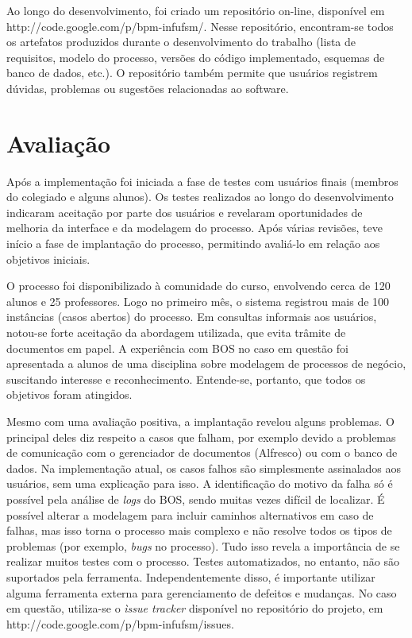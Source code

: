 \documentclass[12pt]{article}
\begin{document}
Ao longo do desenvolvimento, foi criado um repositório on-line, disponível em http://code.google.com/p/bpm-infufsm/. Nesse repositório, encontram-se todos os artefatos produzidos durante o desenvolvimento do trabalho (lista de requisitos, modelo do processo, versões do código implementado, esquemas de banco de dados, etc.). O repositório também permite que usuários registrem dúvidas, problemas ou sugestões relacionadas ao software.


\section{Avaliação}

Após a implementação foi iniciada a fase de testes com usuários finais (membros do colegiado e alguns alunos). Os testes realizados ao longo do desenvolvimento indicaram aceitação por parte dos usuários e revelaram oportunidades de melhoria da interface e da modelagem do processo. Após várias revisões, teve início a fase de implantação do processo, permitindo avaliá-lo em relação aos objetivos iniciais.

O processo foi disponibilizado à comunidade do curso, envolvendo cerca de 120 alunos e 25 professores. Logo no primeiro mês, o sistema registrou mais de 100 instâncias (casos abertos) do processo. Em consultas informais aos usuários, notou-se forte aceitação da abordagem utilizada, que evita trâmite de documentos em papel. A experiência com BOS no caso em questão foi apresentada a alunos de uma disciplina sobre modelagem de processos de negócio, suscitando interesse e reconhecimento. Entende-se, portanto, que todos os objetivos foram atingidos.

Mesmo com uma avaliação positiva, a implantação revelou alguns problemas. O principal deles diz respeito a casos que falham, por exemplo devido a problemas de comunicação com o gerenciador de documentos (Alfresco) ou com o banco de dados. Na implementação atual, os casos falhos são simplesmente assinalados aos usuários, sem uma explicação para isso. A identificação do motivo da falha só é possível pela análise de \emph{logs} do BOS, sendo muitas vezes difícil de localizar. É possível alterar a modelagem para incluir caminhos alternativos em caso de falhas, mas isso torna o processo mais complexo e não resolve todos os tipos de problemas (por exemplo, \emph{bugs} no processo). Tudo isso revela a importância de se realizar muitos testes com o processo. Testes automatizados, no entanto, não são suportados pela ferramenta. Independentemente disso, é importante utilizar alguma ferramenta externa para gerenciamento de defeitos e mudanças. No caso em questão, utiliza-se o \emph{ìssue tracker} disponível no repositório do projeto, em http://code.google.com/p/bpm-infufsm/issues.
\end{document}
